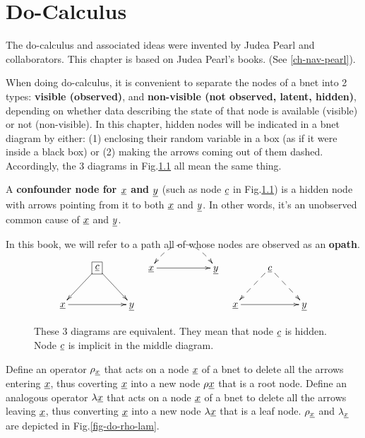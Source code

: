 \chapter{Do-Calculus}\label{ch-do-calc}


The do-calculus and associated ideas were
invented by
Judea Pearl and collaborators.
This chapter is 
based on Judea Pearl's
books. (See \ref{ch-nav-pearl}).


When
doing
do-calculus,
it is 
convenient
to separate
the nodes
of a bnet
into
2  types:
{\bf visible (observed)},
and {\bf non-visible (not observed, latent,
hidden)},
depending
on
whether data
describing
the
state 
of that
node
is available 
(visible) or not (non-visible).
In this chapter, hidden nodes will 
be indicated 
in a bnet
diagram by
either: (1)
enclosing
their random variable
in a box (as
if it were inside a black box) or
(2) making
the arrows
coming
out of them
dashed.
Accordingly, 
the 
3 diagrams 
in
Fig.\ref{fig-hidden-dashes}
all mean the same thing.

A {\bf confounder node
for ${\underline{x}}$ and ${\underline{y}}$}
(such as node
${\underline{c}}$
in Fig.\ref{fig-hidden-dashes})
is a hidden node 
with arrows
pointing
from it to
both
${\underline{x}}$ and ${\underline{y}}$.
In other words, it's
an unobserved common
cause of ${\underline{x}}$ and ${\underline{y}}$.

In this book,
we will refer
to a path
all of whose nodes are
observed as an {\bf opath}.



\begin{figure}[h!]
$$\xymatrix{
&*+[F]{\rvc}\ar[dl]\ar[dr]
\\
\rvx\ar[rr]&&\rvy
}
\;\;\;
\xymatrix{
\rvx\ar@{-->}@{<-->}@/^2pc/[rr]
\ar[rr]&&\rvy
}
\;\;\;
\xymatrix{
&\rvc\ar@{-->}[dl]\ar@{-->}[dr]
\\
\rvx\ar[rr]&&\rvy
}$$
\caption{
These 3 diagrams
are equivalent.
They
mean that node ${\underline{c}}$
is hidden.
Node ${\underline{c}}$
is implicit
in the
middle diagram.}
\label{fig-hidden-dashes}
\end{figure}



Define
an
operator
$\rho_{\underline{x}}$
that acts on
a node
${\underline{x}}$
of a bnet
to
delete
all
the 
arrows
entering
${\underline{x}}$,
thus
coverting
${\underline{x}}$
into
a new
node $\rho {\underline{x}}$
that
is a root node.
Define 
an analogous 
operator
$\lambda{\underline{x}}$
that acts on
a node
${\underline{x}}$
of a bnet
to
delete
all
the 
arrows
leaving
${\underline{x}}$,
thus
converting
${\underline{x}}$
into
a new
node $\lambda {\underline{x}}$
that
is a leaf node.
$\rho_{\underline{x}}$
and
$\lambda_{\underline{x}}$
are
depicted
in Fig.\ref{fig-do-rho-lam}.



